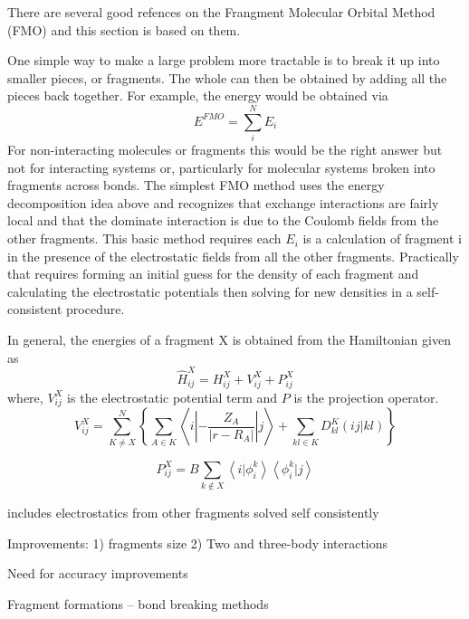 There are several good refences on the Frangment Molecular Orbital Method (FMO) and this section is based on them. \cite{FedKit04, FedKit07, FedKit}

One simple way to make a large problem more tractable is to break it up into smaller pieces, or fragments.  The whole can then be obtained by adding all the pieces back together. For example, the energy would be obtained via 
\begin{equation}
E^{FMO} = \sum_i^N E_i
\end{equation}
For non-interacting molecules or fragments this would be the right answer but not for interacting systems or, particularly for molecular systems broken into fragments across bonds.  The simplest FMO method uses the energy decomposition idea above and recognizes that exchange interactions are fairly local and that the dominate interaction is due to the Coulomb fields from the other fragments.  This basic method requires each $E_i$ is a calculation of fragment i in the presence of the electrostatic fields from all the other fragments.  Practically that requires forming an initial guess for the density of each fragment and calculating the electrostatic potentials then solving for new densities in a self-consistent procedure.

In general, the energies of a fragment X is obtained from the Hamiltonian given as
\begin{equation}
\widehat{H}_{ij}^X = H_{ij}^X + V_{ij}^X + P_{ij}^X
\end{equation}
where, $V_{ij}^X$ is the electrostatic potential term and $P$ is the projection operator.
\begin{equation}
V_{ij}^X = \sum_{K\neq X}^N { \left\{ \sum_{A \in K} { \left\langle i\left|-\frac{Z_A}{\left|r - R_A\right|} \right|j\right\rangle } + \sum_{kl \in K} {D_{kl}^K (ij|kl) } \right\} }
\end{equation}

\begin{equation}
P_{ij}^X = B\sum_{k \notin X} { \left\langle i | \phi_i^k \right\rangle \left\langle \phi_i^k | j \right\rangle }
\end{equation}


includes electrostatics from other fragments
solved self consistently

Improvements:
1) fragments size
2) Two and three-body interactions

Need for accuracy improvements

Fragment formations -- bond breaking methods



